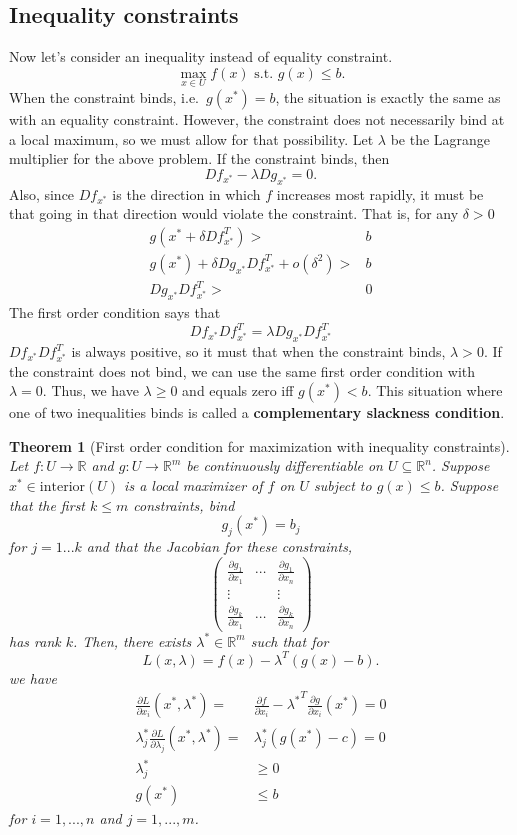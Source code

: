 \documentclass[12pt,reqno]{amsart}
\newtheorem{theorem}{Theorem}[section]
\theoremstyle{definition}
\def\R{\mathbb{R}}
\renewcommand{\to}{{\rightarrow}}
\begin{document}
\subsection{Inequality constraints}

Now let's consider an inequality instead of equality constraint. 
\[ \max_{x \in U} f(x) \text{ s.t. } g(x) \leq b. \]
When the constraint binds, i.e.\ $g(x^*) = b$, the situation is
exactly the same as with an equality constraint. However, the
constraint does not necessarily bind at a local maximum, so we must allow
for that possibility.  Let $\lambda$ be the Lagrange multiplier for
the above problem. If the constraint binds, then
\[ Df_{x^*} - \lambda D g_{x^*} = 0. \]
Also, since $Df_{x^*}$ is the direction in which $f$ increases most
rapidly, it must be that going in that direction would violate the
constraint. That is, for any $\delta > 0$
\begin{align*} 
  g(x^* + \delta Df_{x^*}^T) > & b \\ 
  g(x^*) + \delta Dg_{x^*} Df_{x^*}^T + o(\delta^2) > & b \\
  Dg_{x^*} Df_{x^*}^T > & 0
\end{align*}
The first order condition says that 
\[ Df_{x^*} Df_{x^*}^T =  \lambda D g_{x^*} D f_{x^*}^T \]
$Df_{x^*} Df_{x^*}^T$ is always positive, so it must that when the
constraint binds, $\lambda > 0$. If the constraint does not bind, we
can use the same first order condition with $\lambda=0$. Thus, we have
$\lambda \geq 0$ and equals zero iff $g(x^*) < b$. This situation
where one of two inequalities binds is called a \textbf{complementary
  slackness condition}. 
\begin{theorem}[First order condition for maximization with inequality constraints] \label{thm:icon}
  Let $f:U \to \R$ and $g: U \to \R^m$ be continuously
  differentiable on $U \subseteq \R^n$. Suppose $x^* \in
  \mathrm{interior}(U)$ is a local maximizer of $f$ on $U$ subject to 
  $g(x) \leq b$. Suppose that the first $k \leq m$ constraints, bind
  \[ g_j(x^*) = b_j \]
  for $j = 1 ... k$ and that the Jacobian for these constraints, 
  \[ \begin{pmatrix} 
    \frac{\partial g_1}{\partial x_1} &  \cdots &\frac{\partial g_1}{\partial x_n}  \\
    \vdots & & \vdots \\
    \frac{\partial g_k}{\partial x_1} &  \cdots &\frac{\partial g_k}{\partial x_n}  
  \end{pmatrix}
  \]
  has rank $k$. Then, there exists
  $\lambda^* \in \R^m$ such that for
  \[ L(x,\lambda) = f(x) - \lambda^T (g(x) - b). \]
  we have
  \begin{align*}
    \frac{\partial L}{\partial x_i}(x^*,\lambda^*) = & \frac{\partial
      f}{\partial x_i} - {\lambda^*}^T \frac{\partial g}{\partial
      x_i}(x^*) = 0 \\
    \lambda_j^* \frac{\partial L}{\partial \lambda_j}(x^*,\lambda^*) =
    & \lambda_j^* \left(g(x^*) - c \right)= 0 \\
    \lambda_j^* & \geq 0 \\
    g(x^*) & \leq b
  \end{align*}
  for $i = 1, ..., n$ and $j=1,...,m$.
\end{theorem}
\end{document}
